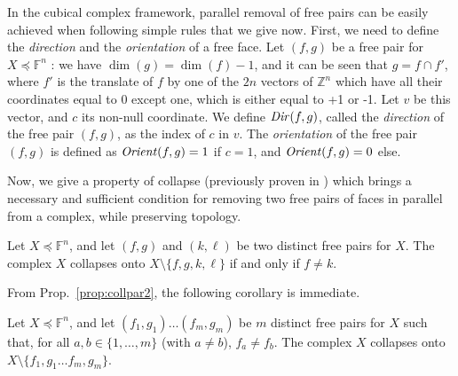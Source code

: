 \documentclass[final,envcountsame]{llncs}
\def\myem#1{{\em #1}}
\def\Zset{\Z}
\def\Z{\mathbb{Z}}
\def\allfaces#1{\mathbb{F}^{#1}}
\def\subcomplex#1#2{#1 \preceq #2}
\def\complex#1#2{\subcomplex{#2}{\allfaces{#1}}}
\def\mydim#1{\dim(#1)}
\def\type#1{\mbox{\it{}Dir\/}(#1)}
\def\orient#1{\mbox{\it{}Orient\/}(#1)}
\def\inter{\cap}
\def\dinterval#1#2{\{#1,\ldots,#2\}}
\def\finproof{\square}
\begin{document}
In the cubical complex framework, parallel removal of free pairs can be easily achieved when following simple rules that we give now. First, we need to define the \myem{direction} and the \myem{orientation} of a free face.
Let $(f,g)$ be a free pair for $\complex{n}{X}$ : we have $\mydim{g} = \mydim{f}-1$, and it can be seen that $g = f \inter f'$, where $f'$ is the translate of $f$ by one of the $2n$ vectors of $\Zset^n$ which have all their coordinates equal to 0 except one, which is either equal to +1 or -1. Let $v$ be this vector, and $c$ its non-null coordinate. We define $\type{f,g}$, called the \myem{direction} of the free pair $(f,g)$, as the index of $c$ in $v$. The \myem{orientation} of the free pair $(f,g)$ is defined as $\orient{f,g}=1$ if $c=1$, and $\orient{f,g}=0$ else.


Now, we give a property of collapse (previously proven in \cite{ChauCou2009}) which brings a necessary and sufficient condition for removing two free pairs of faces in parallel from a complex, while preserving topology.

\begin{proposition}
\label{prop:collpar2}
Let $\complex{n}{X}$, and let $(f,g)$ and $(k,\ell)$ be two distinct free pairs for $X$. The complex $X$ collapses onto $X \setminus \{f,g,k,\ell\}$ if and only if $f \neq k$. 
\end{proposition}


From Prop.~\ref{prop:collpar2}, the following corollary is immediate.

\begin{corollary}
\label{cor:parallel_removal}
Let $\complex{n}{X}$, and let $(f_1,g_1) \ldots (f_m,g_m)$ be $m$ distinct free pairs for $X$ such that, for all $a,b \in
\dinterval{1}{m}$ (with $a \neq b$), $f_a \neq f_b$. The complex $X$ collapses onto $X \setminus \{f_1,g_1 \ldots f_m,g_m\}$.
\end{corollary}
\end{document}
